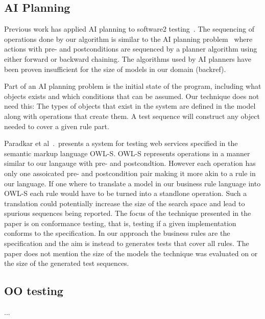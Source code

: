 \subsection{AI Planning}

Previous work has applied AI planning to software2
testing~\cite{Scheetz99ai,Howe97testcase}. The sequencing of
operations done by our algorithm is similar to the AI planning
problem~\cite{Weld94} where actions with pre- and postconditions are sequenced
by a planner algorithm using either forward or backward chaining. The
algorithms used by AI planners have been proven insufficient for the
size of models in our domain (backref).

Part of an AI planning problem is the initial state of the program,
including what objects exists and which conditions that can be
assumed. Our technique does not need this: The types of objects that
exist in the system are defined in the model along with operations
that create them. A test sequence will construct any object needed to
cover a given rule part.

Paradkar et al~\cite{conf/icws/ParadkarSWJOSL07}.\ presents a system
for testing web services specified in the semantic markup language
OWL-S. OWL-S represents operations in a manner similar to our langauge
with pre- and postcondtion. However each operation has only one
assoicated pre- and postcondition pair making it more akin to a rule
in our language. If one where to translate a model in our business
rule language into OWL-S each rule would have to be turned into a
standlone operation. Such a translation could potentially increase the
size of the search space and lead to spurious sequences being
reported. The focus of the technique presented in the paper is on
conformance testing, that is, testing if a given implementation
conforms to the specification. In our approach the business rules are
the specification and the aim is instead to generates tests that cover
all rules. The paper does not mention the size of the models the
technique was evaluated on or the size of the generated test
sequences.

\subsection{OO testing}
 ...
